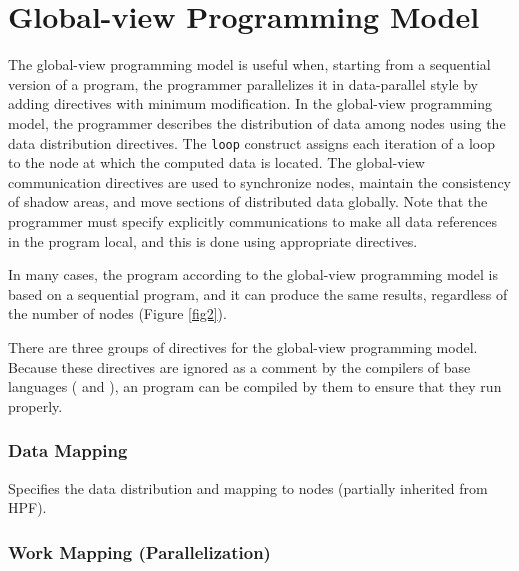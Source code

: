\section{Global-view Programming Model}

The global-view programming model is useful when, starting from a
sequential version of a program, the programmer parallelizes it in
data-parallel style by adding directives with minimum modification.
%
In the global-view programming model, the programmer describes the
distribution of data among nodes using the data distribution
directives.
%
The {\tt loop} construct assigns each iteration of a loop to the node
at which the computed data is located. 
%
The global-view communication directives are used to synchronize nodes,
maintain the consistency of shadow areas, and move sections of 
distributed data globally.
%
Note that the programmer must specify explicitly communications to make
all data references in the program local, and this is done using
appropriate directives.

In many cases, the {\XMP} program according to the global-view
programming model is based on a sequential program, and it can produce
the same results, regardless of the number of nodes (Figure
\ref{fig2}).

There are three groups of directives for the global-view programming
model. Because these directives are ignored as a comment by the
compilers of base languages ({\Fort} and {\C}), an {\XMP} program can be
compiled by them to ensure that they run properly.


\subsubsection*{Data Mapping}

Specifies the data distribution and mapping to nodes (partially
inherited from HPF).

\subsubsection*{Work Mapping (Parallelization)}

